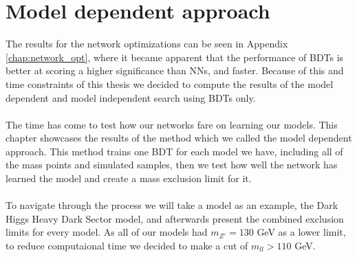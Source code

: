 \documentclass[12pt, a4paper]{book}
\begin{document}
\label{chap:Best_ML}
\chapter{Model dependent approach}
The results for the network optimizations can be seen in Appendix \ref{chap:network_opt}, where it became apparent that the performance of BDTs is better at scoring a higher significance than NNs, and faster. Because of this and time constraints of this thesis 
we decided to compute the results of the model dependent and model independent search using BDTs only. \\\\
The time has come to test how our networks fare on learning our models. This chapter showcases the results of the method which we called the model dependent approach. This method trains one BDT for each model we have, including all of the mass points and simulated samples, 
then we test how well the network has learned the model and create a mass exclusion limit for it.\\
\\To navigate through the process we will take a model as an example, the Dark Higgs Heavy Dark Sector model, and afterwards present the combined exclusion limits for every model. As all of our models had $m_{Z'}=130$ GeV as a lower limit, to reduce computaional time 
we decided to make a cut of $m_{ll} >110$ GeV.

\clearpage
\graphicspath{{../../../Plots/}}
\end{document}
